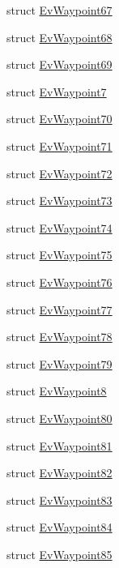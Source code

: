 \begin{DoxyCompactItemize}
\item 
struct \hyperlink{structcl__move__base__z_1_1EvWaypoint67}{Ev\+Waypoint67}
\item 
struct \hyperlink{structcl__move__base__z_1_1EvWaypoint68}{Ev\+Waypoint68}
\item 
struct \hyperlink{structcl__move__base__z_1_1EvWaypoint69}{Ev\+Waypoint69}
\item 
struct \hyperlink{structcl__move__base__z_1_1EvWaypoint7}{Ev\+Waypoint7}
\item 
struct \hyperlink{structcl__move__base__z_1_1EvWaypoint70}{Ev\+Waypoint70}
\item 
struct \hyperlink{structcl__move__base__z_1_1EvWaypoint71}{Ev\+Waypoint71}
\item 
struct \hyperlink{structcl__move__base__z_1_1EvWaypoint72}{Ev\+Waypoint72}
\item 
struct \hyperlink{structcl__move__base__z_1_1EvWaypoint73}{Ev\+Waypoint73}
\item 
struct \hyperlink{structcl__move__base__z_1_1EvWaypoint74}{Ev\+Waypoint74}
\item 
struct \hyperlink{structcl__move__base__z_1_1EvWaypoint75}{Ev\+Waypoint75}
\item 
struct \hyperlink{structcl__move__base__z_1_1EvWaypoint76}{Ev\+Waypoint76}
\item 
struct \hyperlink{structcl__move__base__z_1_1EvWaypoint77}{Ev\+Waypoint77}
\item 
struct \hyperlink{structcl__move__base__z_1_1EvWaypoint78}{Ev\+Waypoint78}
\item 
struct \hyperlink{structcl__move__base__z_1_1EvWaypoint79}{Ev\+Waypoint79}
\item 
struct \hyperlink{structcl__move__base__z_1_1EvWaypoint8}{Ev\+Waypoint8}
\item 
struct \hyperlink{structcl__move__base__z_1_1EvWaypoint80}{Ev\+Waypoint80}
\item 
struct \hyperlink{structcl__move__base__z_1_1EvWaypoint81}{Ev\+Waypoint81}
\item 
struct \hyperlink{structcl__move__base__z_1_1EvWaypoint82}{Ev\+Waypoint82}
\item 
struct \hyperlink{structcl__move__base__z_1_1EvWaypoint83}{Ev\+Waypoint83}
\item 
struct \hyperlink{structcl__move__base__z_1_1EvWaypoint84}{Ev\+Waypoint84}
\item 
struct \hyperlink{structcl__move__base__z_1_1EvWaypoint85}{Ev\+Waypoint85}
\item 

\end{DoxyCompactItemize}
